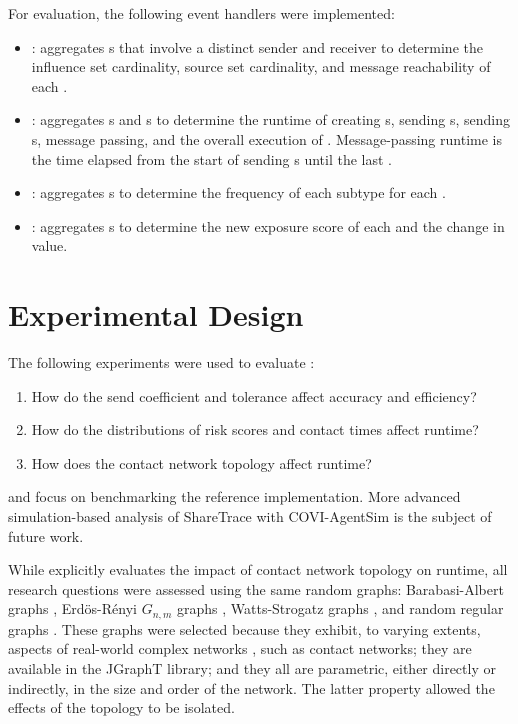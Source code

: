 For evaluation, the following event handlers were implemented:

\begin{itemize}
  \item {}: aggregates s that involve a distinct sender and receiver to determine the influence set cardinality, source set cardinality, and message reachability of each .
  \item {}: aggregates s and s to determine the runtime of creating s, sending s, sending s, message passing, and the overall execution of . Message-passing runtime is the time elapsed from the start of sending s until the last .
  \item {}: aggregates s to determine the frequency of each subtype for each .
  \item {}: aggregates s to determine the new exposure score of each  and the change in value.
\end{itemize}

\section{Experimental Design}

The following experiments were used to evaluate :
\begin{enumerate}[itemsep=-4ex, ref={Experiment \arabic*}]
  \item How do the send coefficient and tolerance affect accuracy and efficiency? \label{item:parameters}
  \item How do the distributions of risk scores and contact times affect runtime? \label{item:distributions}
  \item How does the contact network topology affect runtime? \label{item:topology}
\end{enumerate}
 and  focus on benchmarking the reference implementation. More advanced simulation-based analysis of ShareTrace with COVI-AgentSim \citep{Gupta2020} is the subject of future work.

While  explicitly evaluates the impact of contact network topology on runtime, all research questions were assessed using the same random graphs: Barabasi-Albert graphs \citep{Barabasi1999}, Erd\"{o}s-R\'{e}nyi $G_{n,m}$ graphs \citep{Erdos1959}, Watts-Strogatz graphs \citep{Watts1998}, and random regular graphs \citep{Kim2003}. These graphs were selected because they exhibit, to varying extents, aspects of real-world complex networks \citep{Newman2003}, such as contact networks; they are available in the JGraphT library; and they all are parametric, either directly or indirectly, in the size and order of the network. The latter property allowed the effects of the topology to be isolated.

